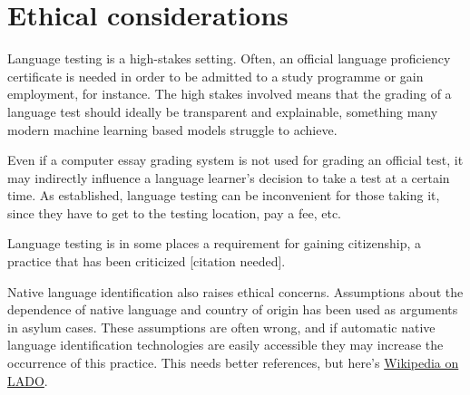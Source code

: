 \section{Ethical considerations}

Language testing is a high-stakes setting. Often, an official language
proficiency certificate is needed in order to be admitted to a study
programme or gain employment, for instance. The high stakes involved means
that the grading of a language test should ideally be transparent and
explainable, something many modern machine learning based models struggle to
achieve.

Even if a computer essay grading system is not used for grading an official
test, it may indirectly influence a language learner's decision to take a
test at a certain time. As established, language testing can be inconvenient
for those taking it, since they have to get to the testing location, pay a
fee, etc.

Language testing is in some places a requirement for gaining citizenship, a
practice that has been criticized [citation needed].

Native language identification also raises ethical concerns. Assumptions
about the dependence of native language and country of origin has been used
as arguments in asylum cases. These assumptions are often wrong, and if
automatic native language identification technologies are easily accessible
they may increase the occurrence of this practice.
This needs better references, but here's 
\href{https://en.wikipedia.org/wiki/Language_analysis_for_the_determination_of_origin}{Wikipedia on LADO}. 
